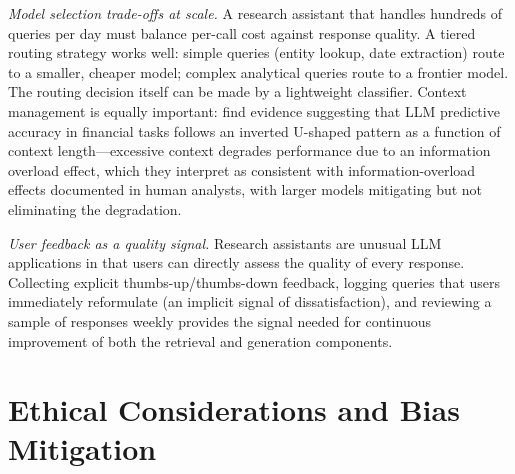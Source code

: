 \begin{context}
\emph{Model selection trade-offs at scale.} A research assistant that handles hundreds of queries per day must balance per-call cost against response quality. A tiered routing strategy works well: simple queries (entity lookup, date extraction) route to a smaller, cheaper model; complex analytical queries route to a frontier model. The routing decision itself can be made by a lightweight classifier. Context management is equally important: \citet{BaloghDidisheim2025} find evidence suggesting that LLM predictive accuracy in financial tasks follows an inverted U-shaped pattern as a function of context length---excessive context degrades performance due to an information overload effect, which they interpret as consistent with information-overload effects documented in human analysts, with larger models mitigating but not eliminating the degradation.

\emph{User feedback as a quality signal.} Research assistants are unusual LLM applications in that users can directly assess the quality of every response. Collecting explicit thumbs-up/thumbs-down feedback, logging queries that users immediately reformulate (an implicit signal of dissatisfaction), and reviewing a sample of responses weekly provides the signal needed for continuous improvement of both the retrieval and generation components.

\end{context}


\section{Ethical Considerations and Bias Mitigation}
\label{sec:af-ethics}

